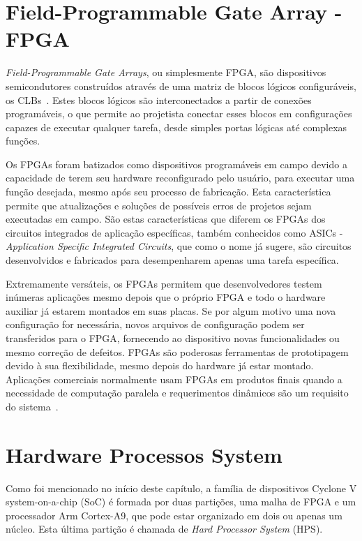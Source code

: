 
\section{Field-Programmable Gate Array - FPGA}
\textit{Field-Programmable Gate Arrays}, ou simplesmente FPGA, são dispositivos semicondutores construídos através de uma matriz de blocos lógicos configuráveis, os CLBs~\cite{FPGAXilinx}. Estes blocos lógicos são interconectados a partir de conexões programáveis, o que permite ao projetista conectar esses blocos em configurações capazes de executar qualquer tarefa, desde simples portas lógicas até complexas funções.

Os FPGAs foram batizados como dispositivos programáveis em campo devido a capacidade de terem seu hardware reconfigurado pelo usuário, para executar uma função desejada, mesmo após seu processo de fabricação. Esta característica permite que atualizações e soluções de possíveis erros de projetos sejam executadas em campo. São estas características que diferem os FPGAs dos circuitos integrados de aplicação específicas, também conhecidos como ASICs - \textit{Application Specific Integrated Circuits}, que como o nome já sugere, são circuitos desenvolvidos e fabricados para desempenharem apenas uma tarefa específica.

Extremamente versáteis, os FPGAs permitem que desenvolvedores testem inúmeras aplicações mesmo depois que o próprio FPGA e todo o hardware auxiliar já estarem montados em suas placas. Se por algum motivo uma nova configuração for necessária, novos arquivos de configuração podem ser transferidos para o FPGA, fornecendo ao dispositivo novas funcionalidades ou mesmo correção de defeitos. FPGAs são poderosas ferramentas de prototipagem devido à sua flexibilidade, mesmo depois do hardware já estar montado. Aplicações comerciais normalmente usam FPGAs em produtos finais quando a necessidade de computação paralela e requerimentos dinâmicos são um requisito do sistema~\cite{FPGAarm}.



\section{Hardware Processos System}
Como foi mencionado no início deste capítulo, a família de dispositivos Cyclone V system-on-a-chip (SoC) é formada por duas partições, uma malha de FPGA e um processador Arm Cortex-A9, que pode estar organizado em dois ou apenas um núcleo. Esta última partição é chamada de \textit{Hard Processor System} (HPS). 

